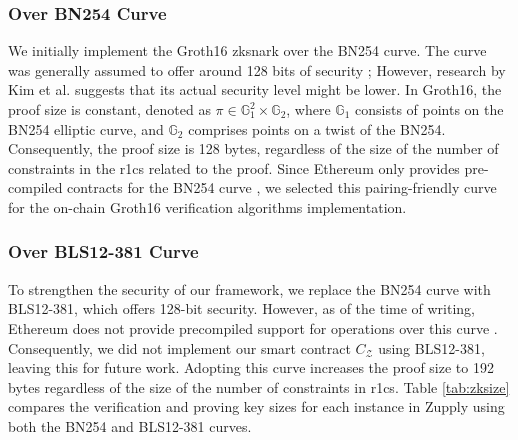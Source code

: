 \subsubsection{Over BN254 Curve}
We initially implement the Groth16 \gls{zksnark} over the BN254 curve. The curve was generally assumed to offer around 128 bits of security \cite{BNcurve}; However, research by Kim et al. \cite{Kim2015Extended} suggests that its actual security level might be lower. In Groth16, the proof size is constant, denoted as \(\pi \in \mathbb{G}_1^2 \times \mathbb{G}_2\), where \(\mathbb{G}_1\) consists of points on the BN254 elliptic curve, and \(\mathbb{G}_2\) comprises points on a twist of the BN254. Consequently, the proof size is 128 bytes, regardless of the size of the number of constraints in the \gls{r1cs} related to the proof.
Since Ethereum only provides pre-compiled contracts for the BN254 curve \cite{EIP197, Housni2022Families}, we selected this pairing-friendly curve for the on-chain Groth16 verification algorithms implementation. 

\subsubsection{Over BLS12-381 Curve}
To strengthen the security of our framework, we replace the BN254 curve with BLS12-381, which offers 128-bit security. However, as of the time of writing, Ethereum does not provide precompiled support for operations over this curve \cite{Vlasov2020}. Consequently, we did not implement our smart contract $C_\mathcal{Z}$ using BLS12-381, leaving this for future work. Adopting this curve increases the proof size to 192 bytes regardless of the size of the number of constraints in  \gls{r1cs}. Table \ref{tab:zksize} compares the verification and proving key sizes for each instance in Zupply using both the BN254 and BLS12-381 curves.

